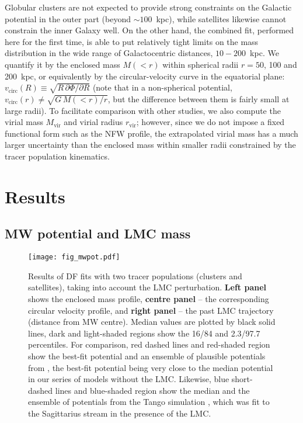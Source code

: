 \documentclass[usenatbib,fleqn]{mnras}
\begin{document}
Globular clusters are not expected to provide strong constraints on the Galactic potential in the outer part (beyond $\sim100$~kpc), while satellites likewise cannot constrain the inner Galaxy well. On the other hand, the combined fit, performed here for the first time, is able to put relatively tight limits on the mass distribution in the wide range of Galactocentric distances, $10-200$~kpc. We quantify it by the enclosed mass $M(<r)$ within spherical radii $r=50$, 100 and 200~kpc, or equivalently by the circular-velocity curve in the equatorial plane: $v_\text{circ}(R)\equiv \sqrt{R\,\partial\Phi/\partial R}$ (note that in a non-spherical potential, $v_\text{circ}(r)\ne \sqrt{G\,M(<r)/r}$, but the difference between them is fairly small at large radii). To facilitate comparison with other studies, we also compute the virial mass $M_\text{vir}$ and virial radius $r_\text{vir}$; however, since we do not impose a fixed functional form such as the NFW profile, the extrapolated virial mass has a much larger uncertainty than the enclosed mass within smaller radii constrained by the tracer population kinematics.


\section{Results}  \label{sec:results}

\subsection{MW potential and LMC mass}  \label{sec:mw_potential}

\begin{figure*}
\texttt{[image: fig\_mwpot.pdf]}
\caption{Results of DF fits with two tracer populations (clusters and satellites), taking into account the LMC perturbation. \textbf{Left panel} shows the enclosed mass profile, \textbf{centre panel} -- the corresponding circular velocity profile, and \textbf{right panel} -- the past LMC trajectory (distance from MW centre). Median values are plotted by black solid lines, dark and light-shaded regions show the 16/84 and 2.3/97.7 percentiles. For comparison, red dashed lines and red-shaded region show the best-fit potential and an ensemble of plausible potentials from \citet{McMillan2017}, the best-fit potential being very close to the median potential in our series of models without the LMC. Likewise, blue short-dashed lines and blue-shaded region show the median and the ensemble of potentials from the Tango simulation \citep{Vasiliev2021b}, which was fit to the Sagittarius stream in the presence of the LMC.
}  \label{fig:mwpot}
\end{figure*}
\end{document}
